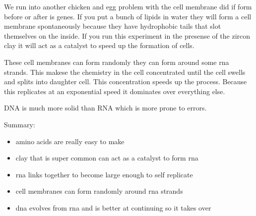 \documentclass{article}
\begin{document}

We run into another chicken and egg problem with the cell membrane did if form before or after is genes. If you put a bunch of lipids in water they will form a cell membrane spontaneously because they have hydrophobic tails that slot themselves on the inside. If you run this experiment in the presense of the zircon clay it will act as a catalyst to speed up the formation of cells.


These cell membranes can form randomly they can form around some rna strands. This makese the chemistry in the cell concentrated until the cell swells and splits into daughter cell. This concentration speeds up the process. Because this replicates at an exponential speed it dominates over everything else.


DNA is much more solid than RNA which is more prone to errors.


Summary:
\begin{itemize}
	\item amino acids are really easy to make
	\item clay that is super common can act as a catalyst to form rna
	\item rna links together to become large enough to self replicate
	\item cell membranes can form randomly around rna strands
	\item dna evolves from rna and is better at continuing so it takes over
\end{itemize}
\end{document}
